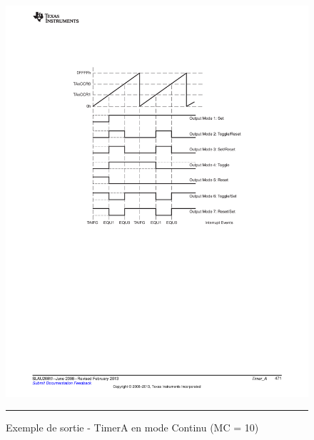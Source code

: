 \begin{figure}[t]
  \centering
  \includegraphics[angle=0, width=14cm]{./Figures/Chap5_Timer/Timer_Out2.pdf}
  \rule{35em}{0.5pt}
  \caption[Outmod_MC2]{Exemple de sortie - TimerA en mode Continu (MC = 10)}
  \label{fig:Outmod_MC2}
\end{figure}


